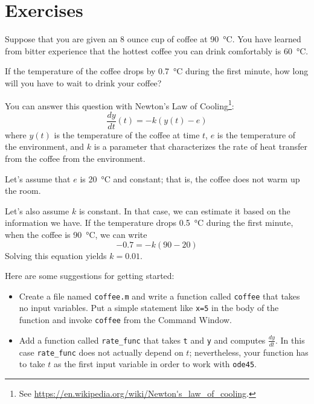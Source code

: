 \documentclass[main.tex]{subfiles}
\begin{document}
\section{Exercises}

\begin{ex}


Suppose that you are given an 8 ounce cup of coffee at \SI{90}{\celsius}.
You have learned from bitter experience that the hottest coffee you
can drink comfortably is \SI{60}{\celsius}.  

If the temperature of the coffee drops by \SI{0.7}{\celsius} during the first minute, how long will you have to wait to drink your coffee?

You can answer this question with Newton's Law of Cooling\footnote{See \url{https://en.wikipedia.org/wiki/Newton's_law_of_cooling}.}:
%
\begin{equation*}
\frac{dy}{dt}(t) = -k (y(t) - e)
\end{equation*}
%
where $y(t)$ is the temperature of the coffee at time $t$,
$e$ is the temperature of the environment, and $k$ is a parameter
that characterizes the rate of heat transfer from the coffee from the environment.

Let's assume that $e$ is \SI{20}{\celsius} and constant; that is, the coffee does not warm up the room.

Let's also assume $k$ is constant.  In that case, we can estimate it based on the information we have.  If the temperature drops \SI{0.5}{\celsius} during the first minute, when the coffee is \SI{90}{\celsius}, we can write
%
\begin{equation*}
-0.7 = -k (90 - 20)
\end{equation*}
%
Solving this equation yields $k = 0.01$.

Here are some suggestions for getting started:

\begin{itemize}

\item Create a file named {\tt coffee.m} and write a function
called {\tt coffee} that takes no input variables.  Put a simple statement like {\tt x=5} in the body of the function and invoke {\tt coffee} from the {\sf Command Window}.

\item Add a function called {\tt rate\_func} that takes {\tt t} and {\tt y} and computes $\frac{dy}{dt}$.  In this case {\tt rate\_func} does not actually depend on $t$; nevertheless, your function has to take $t$ as
the first input variable in order to work with {\tt ode45}.


\end{itemize}
\end{ex}
\end{document}
